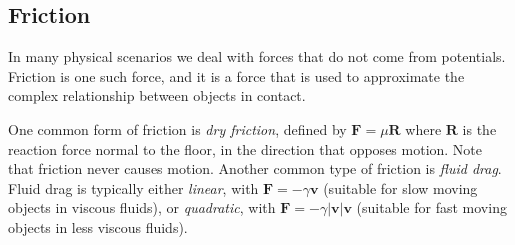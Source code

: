 \documentclass{scrartcl}
\newcommand{\vv}[1]{\boldsymbol{\mathbf{#1}}}
\theoremstyle{definition}
\begin{document}
\subsection*{Friction}

In many physical scenarios we deal with forces that do not come from potentials. Friction is one such force, and it is a force that is used to approximate the complex relationship between objects in contact.

One common form of friction is \emph{dry friction}, defined by $\vv F = \mu \vv R$ where $\vv R$ is the reaction force normal to the floor, in the direction that opposes motion. Note that friction never causes motion. Another common type of friction is \emph{fluid drag}. Fluid drag is typically either \emph{linear}, with $\vv F = - \gamma \vv v$ (suitable for slow moving objects in viscous fluids), or \emph{quadratic}, with $\vv F = - \gamma |\vv v| \vv v$ (suitable for fast moving objects in less viscous fluids).
\end{document}
